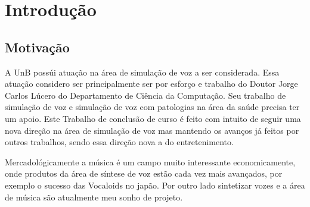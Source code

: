 
\chapter{Introdução}

	\section{Motivação}
		A UnB possúi atuação na área de simulação de voz a ser considerada. Essa atuação considero ser principalmente ser por esforço e trabalho do Doutor Jorge Carlos Lúcero do Departamento de Ciência da Computação. Seu trabalho de simulação de voz e simulação de voz com patologias na área da saúde precisa ter um apoio. Este Trabalho de conclusão de curso é feito com intuito de seguir uma nova direção na área de simulação de voz mas mantendo os avanços já feitos por outros trabalhos, sendo essa direção nova a do entretenimento.
		
		Mercadológicamente a música é um campo muito interessante economicamente, onde produtos da área de síntese de voz estão cada vez mais avançados, por exemplo o sucesso das Vocaloids no japão. Por outro lado sintetizar vozes e a área de música são atualmente meu sonho de projeto.
